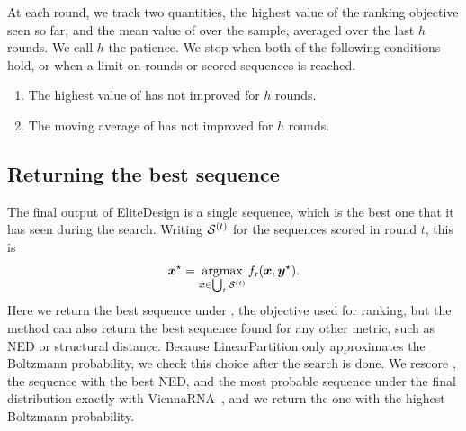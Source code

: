 At each round, we track two quantities, the highest value of the ranking objective \frank seen so far, and the mean value of \frank over the sample, averaged over the last $h$ rounds. We call $h$ the patience. We stop when both of the following conditions hold, or when a limit on rounds or scored sequences is reached.
\begin{enumerate}
\item The highest value of \frank has not improved for $h$ rounds.
\item The moving average of \frank has not improved for $h$ rounds.
\end{enumerate}

\subsection{Returning the best sequence}\label{sec:return}
The final output of EliteDesign is a single sequence, which is the best one that it has seen during the search. Writing $\mathcal{S}^{(t)}$ for the sequences scored in round $t$, this is
\begin{equation}
\vecxstar=\argmax_{\vecx\in\bigcup_t\SAMPLES^{(t)}}\frank(\vecx,\vecystar).
\label{eq:return}
\end{equation}
Here we return the best sequence under \frank, the objective used for ranking, but the method can also return the best sequence found for any other metric, such as NED or structural distance. Because LinearPartition only approximates the Boltzmann probability, we check this choice after the search is done. We rescore \vecxstar, the sequence with the best NED, and the most probable sequence under the final distribution exactly with ViennaRNA~\citep{lorenz2011}, and we return the one with the highest Boltzmann probability.


